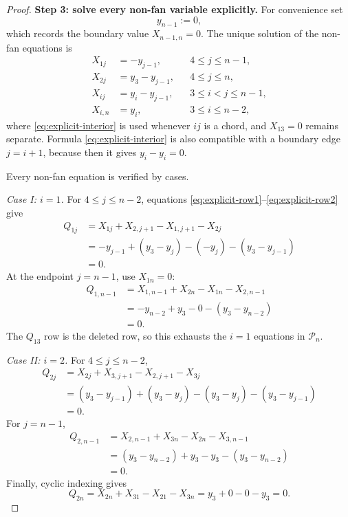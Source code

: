 \documentclass[11pt]{article}
\theoremstyle{definition}
\begin{document}
\begin{proof}
\medskip
\noindent\textbf{Step 3: solve every non-fan variable explicitly.}
For convenience set
\[
 y_{n-1}:=0,
\]
which records the boundary value $X_{n-1,n}=0$.  The unique
solution of the non-fan equations is
\begin{align}
 X_{1j}&=-y_{j-1}, &&4\leq j\leq n-1,
 \label{eq:explicit-row1}\\
 X_{2j}&=y_3-y_{j-1}, &&4\leq j\leq n,
 \label{eq:explicit-row2}\\
 X_{ij}&=y_i-y_{j-1},
 &&3\leq i<j\leq n-1,
 \label{eq:explicit-interior}\\
 X_{i,n}&=y_i, &&3\leq i\leq n-2,
 \label{eq:explicit-fan}
\end{align}
where \eqref{eq:explicit-interior} is used whenever $ij$ is a chord, and
$X_{13}=0$ remains separate.  Formula \eqref{eq:explicit-interior} is also
compatible with a boundary edge $j=i+1$, because then it gives
$y_i-y_i=0$.

Every non-fan equation is verified by cases.

\smallskip
\emph{Case I: $i=1$.}
For $4\leq j\leq n-2$, equations
\eqref{eq:explicit-row1}--\eqref{eq:explicit-row2} give
\begin{align*}
 Q_{1j}
 &=X_{1j}+X_{2,j+1}-X_{1,j+1}-X_{2j}\\
 &=-y_{j-1}+(y_3-y_j)-(-y_j)-(y_3-y_{j-1})\\
 &=0.
\end{align*}
At the endpoint $j=n-1$, use $X_{1n}=0$:
\begin{align*}
 Q_{1,n-1}
 &=X_{1,n-1}+X_{2n}-X_{1n}-X_{2,n-1}\\
 &=-y_{n-2}+y_3-0-(y_3-y_{n-2})\\
 &=0.
\end{align*}
The $Q_{13}$ row is the deleted row, so this exhausts the $i=1$ equations in
$\mathcal P_n$.

\smallskip
\emph{Case II: $i=2$.}
For $4\leq j\leq n-2$,
\begin{align*}
 Q_{2j}
 &=X_{2j}+X_{3,j+1}-X_{2,j+1}-X_{3j}\\
 &=(y_3-y_{j-1})+(y_3-y_j)
   -(y_3-y_j)-(y_3-y_{j-1})\\
 &=0.
\end{align*}
For $j=n-1$,
\begin{align*}
 Q_{2,n-1}
 &=X_{2,n-1}+X_{3n}-X_{2n}-X_{3,n-1}\\
 &=(y_3-y_{n-2})+y_3-y_3-(y_3-y_{n-2})\\
 &=0.
\end{align*}
Finally, cyclic indexing gives
\[
 Q_{2n}=X_{2n}+X_{31}-X_{21}-X_{3n}
       =y_3+0-0-y_3=0.
\]


\end{proof}
\end{document}

